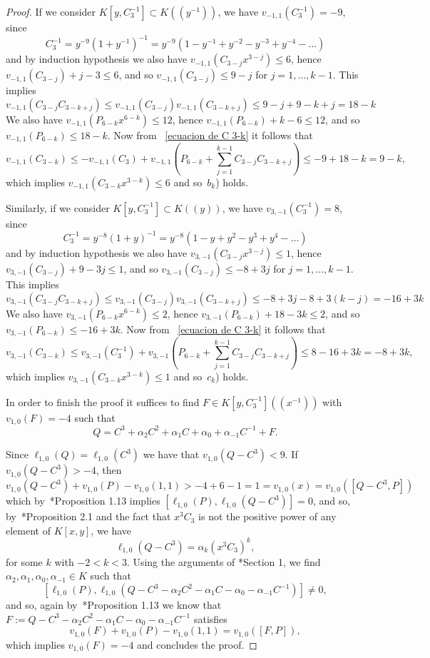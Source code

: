 \documentclass[reqno,a4paper,twoside]{amsart}
\theoremstyle{definition}
\theoremstyle{remark}
\begin{document}
\begin{proof}
If we consider $K[y,C_3^{-1}]\subset K((y^{-1}))$, we have $v_{-1,1}(C_3^{-1})=-9$, since
$$
C_3^{-1}=y^{-9}(1+y^{-1})^{-1}=y^{-9}(1-y^{-1}+y^{-2}-y^{-3}+y^{-4}-\dots)
$$
and by induction hypothesis we also have $v_{-1,1}(C_{3-j}x^{3-j})\le 6$, hence $v_{-1,1}(C_{3-j})+j-3\le 6$, and so $v_{-1,1}(C_{3-j})\le 9-j$ for $j=1,\dots ,k-1$.
This implies
$$
v_{-1,1}(C_{3-j}C_{3-k+j})\le  v_{-1,1}(C_{3-j}) v_{-1,1}(C_{3-k+j})\le 9-j+9-k+j=18-k
$$
We also have $v_{-1,1}(P_{6-k}x^{6-k})\le 12$, hence $v_{-1,1}(P_{6-k})+k-6\le 12$, and so $v_{-1,1}(P_{6-k})\le 18-k$.
Now from ~\eqref{ecuacion de C 3-k} it follows that
$$
v_{-1,1}(C_{3-k})\le -v_{-1,1}(C_3)+v_{-1,1}\left( P_{6-k}+\sum_{j=1}^{k-1}C_{3-j}C_{3-k+j}\right)\le -9+18-k=9-k,
$$
which implies $v_{-1,1}(C_{3-k}x^{3-k})\le 6$ and so~$b_k$) holds.

Similarly, if we consider $K[y,C_3^{-1}]\subset K((y))$, we have $v_{3,-1}(C_3^{-1})=8$, since
$$
C_3^{-1}=y^{-8}(1+y)^{-1}=y^{-8}(1-y+y^{2}-y^{3}+y^{4}-\dots)
$$
and by induction hypothesis we also have $v_{3,-1}(C_{3-j}x^{3-j})\le 1$, hence $v_{3,-1}(C_{3-j})+9-3j\le 1$, and so $v_{3,-1}(C_{3-j})\le -8+3j$ for $j=1,\dots ,k-1$.
This implies
$$
v_{3,-1}(C_{3-j}C_{3-k+j})\le  v_{3,-1}(C_{3-j}) v_{3,-1}(C_{3-k+j})\le -8+3j-8+3(k-j)=-16+3k
$$
We also have $v_{3,-1}(P_{6-k}x^{6-k})\le 2$, hence $v_{3,-1}(P_{6-k})+18-3k\le 2$, and so $v_{3,-1}(P_{6-k})\le -16+3k$.
Now from ~\eqref{ecuacion de C 3-k} it follows that
$$
v_{3,-1}(C_{3-k})\le v_{3,-1}(C_3^{-1})+v_{3,-1}\left( P_{6-k}+\sum_{j=1}^{k-1}C_{3-j}C_{3-k+j}\right)\le 8-16+3k=-8+3k,
$$
which implies $v_{3,-1}(C_{3-k}x^{3-k})\le 1$ and so~$c_k$) holds.

In order to finish the proof it suffices to find $F\in K[y,C_3^{-1}]((x^{-1}))$
with $v_{1,0}(F)=-4$ such that
\begin{equation}\label{igualdad para Q}
Q=C^3 +\alpha_2 C^2+\alpha_1 C+\alpha_0+\alpha_{-1}C^{-1}+F.
\end{equation}

Since $\ell_{1,0}(Q)=\ell_{1,0}(C^3)$ we have that $v_{1,0}(Q-C^3)<9$. If $v_{1,0}(Q-C^3)>-4$, then
$$
v_{1,0}(Q-C^3)+v_{1,0}(P)-v_{1,0}(1,1)>-4+6-1=1=v_{1,0}(x)= v_{1,0}([Q-C^3,P])
$$
which by~\cite{GGV1}*{Proposition 1.13} implies $[\ell_{1,0}(P), \ell_{1,0}(Q-C^3)]=0$, and so, by~\cite{GGV1}*{Proposition 2.1} and the fact that $x^3C_3$ is not the positive
power of any element of $K[x,y]$, we have
$$
\ell_{1,0}(Q-C^3)=\alpha_k (x^3 C_3)^k,
$$
for some $k$ with $-2<k<3$. Using the arguments of \cite{GGV3}*{Section 1}, we find $\alpha_{2},\alpha_{1},\alpha_{0},\alpha_{-1}\in K$ such that
$$
[\ell_{1,0}(P), \ell_{1,0}(Q-C^3-\alpha_2 C^2-\alpha_1 C-\alpha_0-\alpha_{-1}C^{-1})]\ne 0,
$$
and so, again by~\cite{GGV1}*{Proposition 1.13} we know that  $F:=Q-C^3-\alpha_2 C^2-\alpha_1 C-\alpha_0-\alpha_{-1}C^{-1}$ satisfies
$$
v_{1,0}(F)+v_{1,0}(P)-v_{1,0}(1,1)=v_{1,0}([F,P]),
$$
which implies $v_{1,0}(F)=-4$ and concludes the proof.
\end{proof}
\end{document}
